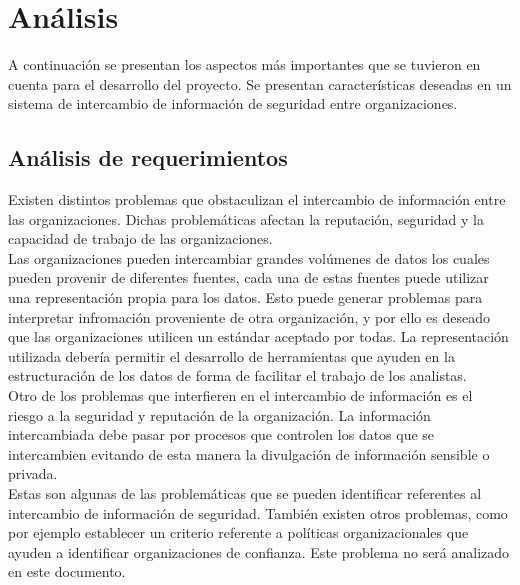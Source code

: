 \setlength\tabcolsep{1mm}
\renewcommand\arraystretch{1.3}
\renewcommand\theFigura{\arabic{Figura}}
\renewcommand\theTabla{\arabic{Tabla}}

\chapter{Análisis}
\label{capitulo2}
	
	A continuación se presentan los aspectos más importantes que se tuvieron en cuenta para el desarrollo del proyecto. Se
	presentan características deseadas en un sistema de intercambio de información de seguridad entre organizaciones.

\section{Análisis de requerimientos}
	Existen distintos problemas que obstaculizan el intercambio de información entre las organizaciones. Dichas
	problemáticas afectan la reputación, seguridad y la capacidad de trabajo de las organizaciones. \\

	Las organizaciones pueden intercambiar grandes volúmenes de datos los cuales pueden provenir de diferentes fuentes, cada
	una de estas fuentes puede utilizar una representación propia para los datos. Esto puede generar problemas para interpretar infromación proveniente de otra organización, y por ello es deseado que las
	organizaciones utilicen un estándar aceptado por todas. La representación utilizada debería permitir el desarrollo de
	herramientas que ayuden en la estructuración de los datos de forma de facilitar el trabajo de los
	analistas.\\

	Otro de los problemas que interfieren en el intercambio de información es el riesgo a la seguridad y reputación de la
	organización. La información intercambiada debe pasar por procesos que controlen los datos que se intercambien evitando
	de esta manera la divulgación de información sensible o privada.\\

	Estas son algunas de las problemáticas que se pueden identificar referentes al intercambio de información de seguridad.
	También existen otros problemas, como por ejemplo establecer un criterio referente a políticas organizacionales que
	ayuden a identificar organizaciones de confianza. Este problema no será analizado en este documento.\\



